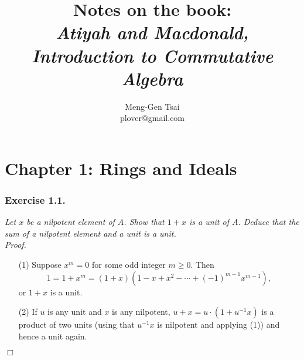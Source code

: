 \documentclass{article}
\title{\textbf{Notes on the book: \\
\emph{Atiyah and Macdonald, Introduction to Commutative Algebra}}}
\author{Meng-Gen Tsai \\ plover@gmail.com}
\begin{document}
\maketitle
\tableofcontents












\newpage
\section*{Chapter 1: Rings and Ideals \\}



\subsubsection*{Exercise 1.1.}
\emph{Let $x$ be a nilpotent element of $A$.
Show that $1+x$ is a unit of $A$.
Deduce that the sum of a nilpotent element and a unit is a unit.} \\



\emph{Proof.}
\begin{enumerate}
\item[(1)]
  Suppose $x^m = 0$ for some odd integer $m \geq 0$.
  Then
  \[
    1 = 1+x^m = (1+x)(1-x+x^2-\cdots+(-1)^{m-1}x^{m-1}),
  \]
  or $1+x$ is a unit.

\item[(2)]
  If $u$ is any unit and $x$ is any nilpotent,
  $u + x= u \cdot (1 + u^{-1}x)$ is a product of two units
  (using that $u^{-1}x$ is nilpotent and applying (1))
  and hence a unit again.
\end{enumerate}
$\Box$ \\
\end{document}
